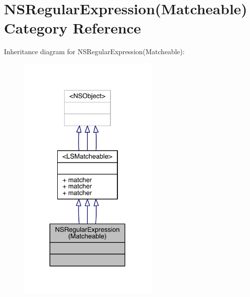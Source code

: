 \hypertarget{category_n_s_regular_expression_07_matcheable_08}{\section{N\-S\-Regular\-Expression(Matcheable) Category Reference}
\label{category_n_s_regular_expression_07_matcheable_08}
}


Inheritance diagram for N\-S\-Regular\-Expression(Matcheable)\-:\nopagebreak
\begin{figure}[H]
\begin{center}
\leavevmode
\includegraphics[width=194pt]{category_n_s_regular_expression_07_matcheable_08__inherit__graph}
\end{center}
\end{figure}


